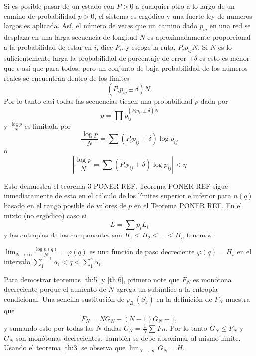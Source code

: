 \begin{appendices}
Si es posible pasar de un estado con $P>0$ a cualquier otro a lo largo
de un camino de probabilidad $p>0$, el sistema es erg\'odico y una
fuerte ley de numeros largos es aplicada.  As\'i, el n\'umero de veces
que un camino dado $p_{ij}$ en una red se desplaza en una larga
secuencia de longitud $N$ es aproximadamente proporcional a la
probabilidad de estar en $i$, dice $P_{i}$, y escoge la ruta,
$P_{i}p_{ij}N$. Si $N$ es lo suficientemente larga la probabilidad de
porcentaje de error $\pm\delta$ es esto es menor que $\epsilon$ as\'i
que para todos, pero un conjunto de baja probabilidad de los n\'umeros
reales se encuentran dentro de los l\'imites
\begin{equation}
(P_{i}p_{ij}\pm \delta)N.
\end{equation}
Por lo tanto casi todas las secuencias tienen una probabilidad $p$ dada
por
\begin{equation}
p=\prod p_{ij}^{(P_{i}p_{ij}\pm \delta)N}
\end{equation}
y $\frac{\log  p}{N}$ es limitada por
\begin{equation}
\frac{\log  p}{N} = \sum (P_{i}p_{ij}\pm \delta)\log  p_{ij}
\end{equation}
o
\begin{equation}
\left|\frac{\log  p}{N} = \sum (P_{i}p_{ij}\pm \delta)\log p_{ij}\right|<\eta
\end{equation}

Esto demuestra el teorema 3 PONER REF. Teorema PONER REF sigue
inmediatamente de esto en el c\'alculo de los l\'imites superior e
inferior para $n(q)$ basado en el rango posible de valores de $p$ en
el Teorema PONER REF.  En el mixto (no erg\'{o}dico) caso si
\begin{equation}
L = \sum p_{i}L_{i}
\end{equation}
y las entropias de los componentes son $H_{1}\leq H_{2}\leq ... \leq
H_{n}$ tenemos :
\begin{theorem}
$\lim_{N\rightarrow \infty }\frac{\log n(q)}{N}=\varphi (q)$ es una
funci\'on de paso decreciente $\varphi (q)=H_{s}$ en el intervalo
$\sum_{1}^{s-1}\alpha_{i}<q<\sum_{1}^{s}\alpha_{i}$.
\label{nuevo}
\end{theorem}

Para demostrar teoremas \ref{th:5} y \ref{th:6}, primero note que
$F_{N}$ es mon\'otona decreciente porque el aumento de $N$ agrega un
sub\'indice a la entrop\'ia condicional. Una sencilla sustituci\'{o}n
de $p_{B_{i}}(S_{j})$ en la definici\'on de $F_{N}$ muestra que
\begin{equation}
F_{N} = NG_{N}-(N-1)G_{N}-1,
\end{equation}
y sumando esto por todas las $N$ dadas $G_{N}=\frac{1}{N}\sum
F{n}$. Por lo tanto $G_{N}\leq F_{N}$ y $G_{N}$ son mon\'{o}tonas
decrecientes. Tambi\'en se debe aproximar al mismo l\'imite. Usando el
teorema \ref{th:3} se observa que $\lim_{N\rightarrow \infty } G_{N} =
H$.


\end{appendices}
